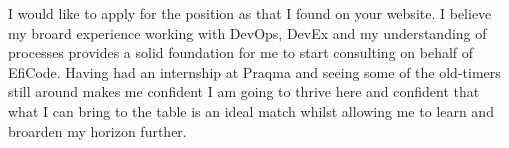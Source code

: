 


I would like to apply for the position as \position that I found on your website.
I believe my broard experience working with DevOps, DevEx and my understanding of processes provides a solid foundation for me to start consulting on behalf of EfiCode. Having had an internship at Praqma and seeing some of the old-timers still around makes me confident I am going to thrive here and confident that what I can bring to the table is an ideal match whilst allowing me to learn and broarden my horizon further.
